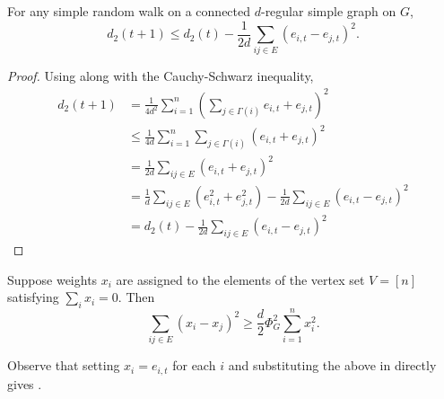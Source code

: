 \begin{lemma}
\label{random walk speed of convergence conductance lemma 1}
For any simple random walk on a connected $d$-regular simple graph on $G$,
\[ d_2(t+1) \leq d_2(t) - \frac{1}{2d}\sum_{ij\in E}(e_{i,t}-e_{j,t})^2. \]
\end{lemma}
\begin{proof}
Using  along with the Cauchy-Schwarz inequality,
\begin{align*}
    d_2(t+1) &= \frac{1}{4d^2} \sum_{i=1}^n \left( \sum_{j\in\Gamma(i)} e_{i,t}+e_{j,t}\right)^2 \\
    &\leq \frac{1}{4d} \sum_{i=1}^n \sum_{j\in\Gamma(i)} (e_{i,t}+e_{j,t})^2 \\
    &= \frac{1}{2d} \sum_{ij\in E} (e_{i,t}+e_{j,t})^2 \\
    &= \frac{1}{d} \sum_{ij\in E} (e_{i,t}^2 + e_{j,t}^2) - \frac{1}{2d} \sum_{ij\in E}(e_{i,t}-e_{j,t})^2 \\
    &= d_2(t) - \frac{1}{2d} \sum_{ij\in E} (e_{i,t}-e_{j,t})^2
\end{align*}
\end{proof}

\begin{lemma}
Suppose weights $x_i$ are assigned to the elements of the vertex set $V=[n]$ satisfying $\sum_i x_i = 0$. Then
\[ \sum_{ij\in E} (x_i-x_j)^2 \geq \frac{d}{2}\Phi_G^2 \sum_{i=1}^n x_i^2. \]
\end{lemma}

Observe that setting $x_i=e_{i,t}$ for each $i$ and substituting the above in  directly gives .

